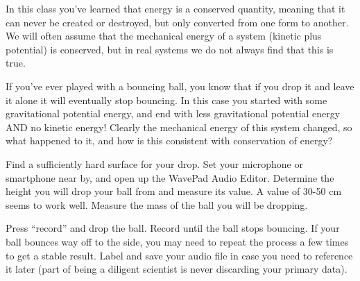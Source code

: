 \renewcommand\thechapter{c1.8}
\label{lab:ballbounce}

\apparatus
{}


\introduction

In this class you've learned that energy is a conserved quantity, meaning that it can never be created or destroyed, but only converted from one form to another. We will often assume that the mechanical energy of a system (kinetic plus potential) is conserved, but in real systems we do not always find that this is true. 

If you've ever played with a bouncing ball, you know that if you drop it and leave it alone it will eventually stop bouncing.  In this case you started with some gravitational potential energy, and end with less gravitational potential energy AND no kinetic energy! Clearly the mechanical energy of this system changed, so what happened to it, and how is this consistent with conservation of energy?

\observations

Find a sufficiently hard surface for your drop. Set your microphone or smartphone near by, and open up the WavePad Audio Editor. Determine the height you will drop your ball from and measure its value.  A value of 30-50 cm seems to work well. Measure the mass of the ball you will be dropping.

Press ``record'' and drop the ball. Record until the ball stops bouncing.  If your ball bounces way off to the side, you may need to repeat the process a few times to get a stable result. Label and save your audio file in case you need to reference it later (part of being a diligent scientist is never discarding your primary data).  

